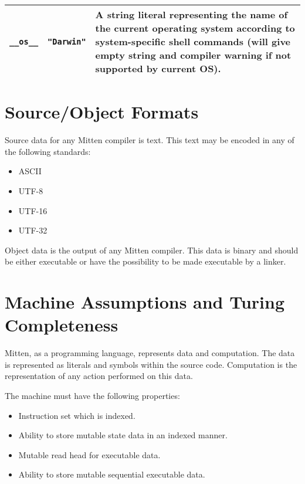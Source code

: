 \documentclass[10pt,a4paper]{article}
\begin{document}
\begin{tabular}{| l l p{4cm} |}
\hline
\verb|__os__| & \verb|"Darwin"| & A string literal representing the name of the current operating system according to system-specific shell commands (will give empty string and compiler warning if not supported by current OS). \\
\hline
\end{tabular}

\newpage





\section{Source/Object Formats}
\label{sec:SourceData}
Source data for any Mitten compiler is text. This text may be encoded in any of the following standards:
\begin{itemize}
  \item ASCII
  \item UTF-8
  \item UTF-16
  \item UTF-32
\end{itemize}

Object data is the output of any Mitten compiler. This data is binary and should be either executable or have the possibility to be made executable by a linker. 

\newpage




\section{Machine Assumptions and Turing Completeness}
Mitten, as a programming language, represents data and computation. The data is represented as literals and symbols within the source code. Computation is the representation of any action performed on this data. 

The machine must have the following properties:
\begin{itemize}
  \item Instruction set which is indexed.
  \item Ability to store mutable state data in an indexed manner.
  \item Mutable read head for executable data.
  \item Ability to store mutable sequential executable data.
\end{itemize}
\end{document}

